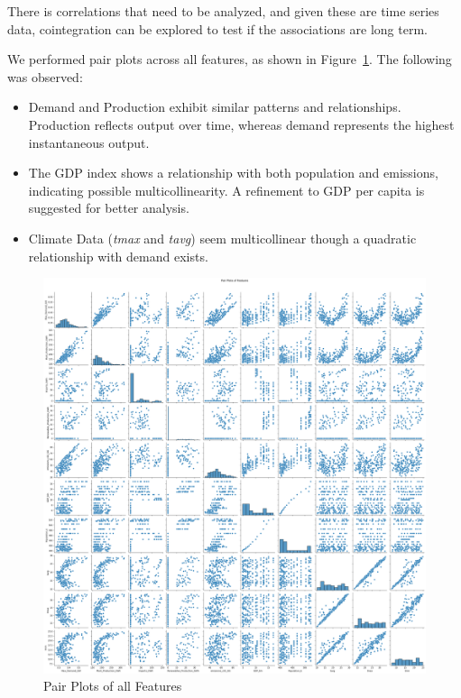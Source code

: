 \documentclass{ieeeaccess}
\begin{document}
There is correlations that need to be analyzed, and given these are time series data, cointegration can be explored to test if the associations are long term. 

We performed pair plots across all features, as shown in Figure~\ref{fig:pair_plots}. The following was observed:
\begin{itemize}
    \item Demand and Production exhibit similar patterns and relationships. Production reflects output over time, whereas demand represents the highest instantaneous output.
    \item The GDP index shows a relationship with both population and emissions, indicating possible multicollinearity. A refinement to GDP per capita is suggested for better analysis.
    \item Climate Data (\textit{tmax} and \textit{tavg}) seem multicollinear though a quadratic relationship with demand exists.
\end{itemize}

\begin{figure}[htb]
    \centering
    \includegraphics[width=\columnwidth]{data_analysis/pair_plots.png}
    \caption{Pair Plots of all Features}
    \label{fig:pair_plots}
\end{figure}
\end{document}
